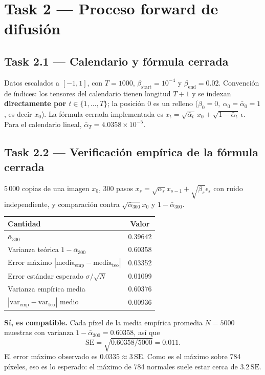 \documentclass[11pt]{article}
\begin{document}
\section*{Task 2 --- Proceso forward de difusión}

\subsection*{Task 2.1 --- Calendario y fórmula cerrada}
Datos escalados a $[-1,1]$, con $T=1000$, $\beta_{\text{start}}=10^{-4}$ y $\beta_{\text{end}}=0.02$. Convención de índices: los tensores del calendario tienen longitud $T+1$ y se indexan \textbf{directamente por $t\in\{1,\dots,T\}$}; la posición 0 es un relleno ($\beta_0=0,\ \alpha_0=\bar\alpha_0=1$, es decir $x_0$). La fórmula cerrada implementada es $x_t=\sqrt{\bar\alpha_t}\,x_0+\sqrt{1-\bar\alpha_t}\,\epsilon$. Para el calendario lineal, $\bar\alpha_T = 4.0358\times10^{-5}$.

\subsection*{Task 2.2 --- Verificación empírica de la fórmula cerrada}
5\,000 copias de una imagen $x_0$, 300 pasos $x_s=\sqrt{\alpha_s}x_{s-1}+\sqrt{\beta_s}\epsilon_s$ con ruido independiente, y comparación contra $\sqrt{\bar\alpha_{300}}x_0$ y $1-\bar\alpha_{300}$.

\begin{table}[H]
\centering
\begin{tabular}{lc}
\toprule
Cantidad & Valor \\
\midrule
$\bar\alpha_{300}$ & 0.39642 \\
Varianza teórica $1-\bar\alpha_{300}$ & 0.60358 \\
Error máximo $|\text{media}_{\text{emp}}-\text{media}_{\text{teo}}|$ & 0.03352 \\
Error estándar esperado $\sigma/\sqrt N$ & 0.01099 \\
Varianza empírica media & 0.60376 \\
$|\text{var}_{\text{emp}}-\text{var}_{\text{teo}}|$ medio & 0.00936 \\
\bottomrule
\end{tabular}
\end{table}

\textbf{Sí, es compatible.} Cada píxel de la media empírica promedia $N=5000$ muestras con varianza $1-\bar\alpha_{300}=0.60358$, así que
\[\text{SE}=\sqrt{0.60358/5000}=0.011.\]
El error máximo observado es $0.0335\approx3\,\text{SE}$. Como es el máximo sobre 784 píxeles, eso es lo esperado: el máximo de 784 normales suele estar cerca de $3.2\,\text{SE}$.
\end{document}
